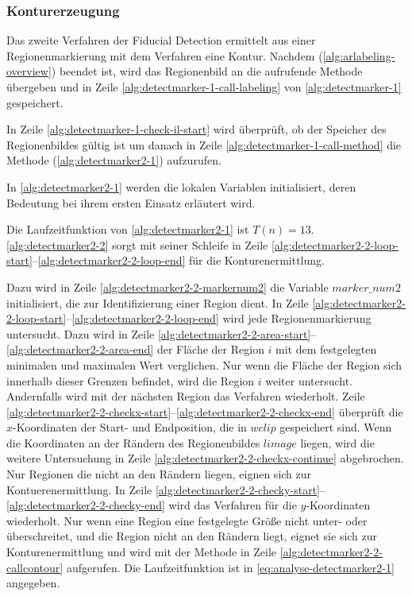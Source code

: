 \subsubsection{Konturerzeugung} %
\label{sec:konturerzeugung}

Das zweite Verfahren der Fiducial Detection ermittelt aus einer Regionenmarkierung mit dem Verfahren
  eine Kontur. Nachdem  (\autoref{alg:arlabeling-overview}) beendet ist,
 wird das Regionenbild an die aufrufende Methode  übergeben und in Zeile
 \ref{alg:detectmarker-1-call-labeling} von \autoref{alg:detectmarker-1} gespeichert.

In Zeile \ref{alg:detectmarker-1-check-il-start} wird überprüft, ob der Speicher des Regionenbildes gültig ist um
 danach in Zeile \ref{alg:detectmarker-1-call-method} die Methode 
 (\autoref{alg:detectmarker2-1}) aufzurufen.

In \autoref{alg:detectmarker2-1} werden die lokalen Variablen initialisiert, deren Bedeutung bei ihrem ersten Einsatz
 erläutert wird.

Die Laufzeitfunktion von \autoref{alg:detectmarker2-1} ist $T(n) = 13$. \autoref{alg:detectmarker2-2} sorgt mit seiner
 Schleife in Zeile \ref{alg:detectmarker2-2-loop-start}--\ref{alg:detectmarker2-2-loop-end} für die Konturenermittlung.

Dazu wird in Zeile \ref{alg:detectmarker2-2-markernum2} die Variable $\mathit{marker\_num2}$ initialisiert, die zur
 Identifizierung einer Region dient. In Zeile \ref{alg:detectmarker2-2-loop-start}--\ref{alg:detectmarker2-2-loop-end}
 wird jede Regionenmarkierung untersucht. Dazu wird in Zeile
 \ref{alg:detectmarker2-2-area-start}--\ref{alg:detectmarker2-2-area-end} der Fläche der Region $i$ mit dem festgelegten
 minimalen und maximalen Wert verglichen. Nur wenn die Fläche der Region sich innerhalb dieser Grenzen befindet, wird
 die Region $i$ weiter untersucht. Andernfalls wird mit der nächsten Region das Verfahren wiederholt. Zeile
 \ref{alg:detectmarker2-2-checkx-start}--\ref{alg:detectmarker2-2-checkx-end} überprüft die $x$-Koordinaten der
 Start- und Endposition, die in $\mathit{wclip}$ gespeichert sind. Wenn die Koordinaten an der Rändern des
 Regionenbildes $\mathit{limage}$ liegen, wird die weitere Untersuchung in Zeile
 \ref{alg:detectmarker2-2-checkx-continue} abgebrochen. Nur Regionen die nicht an den Rändern liegen, eignen sich zur
 Kontuerenermittlung. In Zeile \ref{alg:detectmarker2-2-checky-start}--\ref{alg:detectmarker2-2-checky-end} wird das
 Verfahren für die $y$-Koordinaten wiederholt. Nur wenn eine Region eine festgelegte Größe nicht unter- oder
 überschreitet, und die Region nicht an den Rändern liegt,
 eignet sie sich zur Konturenermittlung und wird mit der Methode  in Zeile
 \ref{alg:detectmarker2-2-callcontour} aufgerufen. Die Laufzeitfunktion ist in \autoref{eq:analyse-detectmarker2-1}
 angegeben.


